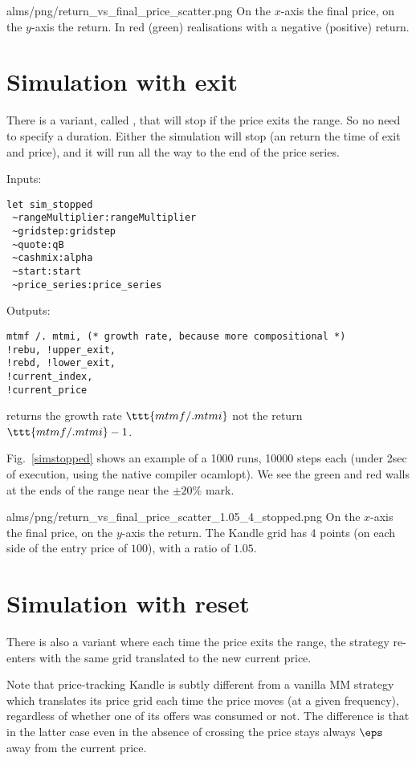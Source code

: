 \documentclass[oneside,10pt]{article}
\begin{document}
\IG{300pt}
{alms/png/return_vs_final_price_scatter.png}
{\label{sim} On the $x$-axis the final price, on the $y$-axis the return. In red (green) realisations with a negative (positive) return.}

\section{Simulation with exit}
There is a variant, called , that will stop if the price exits the range. So no need to specify a duration.
Either the simulation will stop (an return the time of exit and price), and it will run all the way to the
end of the price series.

Inputs:
\begin{verbatim}
let sim_stopped 
 ~rangeMultiplier:rangeMultiplier 
 ~gridstep:gridstep 
 ~quote:qB 
 ~cashmix:alpha
 ~start:start 
 ~price_series:price_series 
\end{verbatim}
 
Outputs:
\begin{verbatim}
mtmf /. mtmi, (* growth rate, because more compositional *)
!rebu, !upper_exit,
!rebd, !lower_exit, 
!current_index,
!current_price
\end{verbatim}


\NB[1]  returns the growth rate $\ttt{mtmf /. mtmi}$ not the return $\ttt{mtmf /. mtmi} - 1$.

Fig.~\ref{simstopped} shows an example of a 1000 runs, 10000 steps each (under 2sec of execution, using the native compiler ocamlopt). 
We see the green and red walls at the ends of the range near the $\pm20\%$ mark.

\IG{250pt}
{alms/png/return_vs_final_price_scatter_1.05_4_stopped.png}
{\label{simstopped} On the $x$-axis the final price, on the $y$-axis the return. The Kandle grid has 4 points (on each side of the entry price of $100$), with a ratio of $1.05$.}


\section{Simulation with reset}
There is also a  variant where each time the price exits the range,
the strategy re-enters with the same grid translated to the new current price.

Note that price-tracking Kandle is subtly different from a vanilla MM strategy which translates its price grid each time the price moves (at a given frequency),
regardless of whether one of its offers was consumed or not. 
The difference is that in the latter case even in the absence of crossing the price stays always $\eps$ away from the current price.
\end{document}
